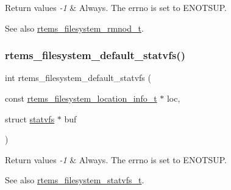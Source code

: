 \begin{DoxyRetVals}{Return values}
{\em -\/1} & Always. The errno is set to E\+N\+O\+T\+S\+UP.\\
\hline
\end{DoxyRetVals}
\begin{DoxySeeAlso}{See also}
\mbox{\hyperlink{group__LibIOFSOps_ga59f7a2562e7acba10bae871649c5d0f3}{rtems\+\_\+filesystem\+\_\+rmnod\+\_\+t}}. 
\end{DoxySeeAlso}
\mbox{\label{group__LibIOFSOps_gab61aa6a004147ff2c28fd3d0b105928c}} 
\subsubsection{\texorpdfstring{rtems\_filesystem\_default\_statvfs()}{rtems\_filesystem\_default\_statvfs()}}
{\footnotesize\ttfamily int rtems\+\_\+filesystem\+\_\+default\+\_\+statvfs (\begin{DoxyParamCaption}\item[{const \mbox{\hyperlink{group__LibIO_ga3252b3d31ee3c49ffff0b7604a676864}{rtems\+\_\+filesystem\+\_\+location\+\_\+info\+\_\+t}} $\ast$}]{loc,  }\item[{struct \mbox{\hyperlink{structstatvfs}{statvfs}} $\ast$}]{buf }\end{DoxyParamCaption})}


\begin{DoxyRetVals}{Return values}
{\em -\/1} & Always. The errno is set to E\+N\+O\+T\+S\+UP.\\
\hline
\end{DoxyRetVals}
\begin{DoxySeeAlso}{See also}
\mbox{\hyperlink{group__LibIOFSOps_ga0866278bfe736fad7750e3e89c5fc93b}{rtems\+\_\+filesystem\+\_\+statvfs\+\_\+t}}. 
\end{DoxySeeAlso}
\mbox{\label{group__LibIOFSOps_gab04c987aeb43aca10df08f0d20d3c462}} 
